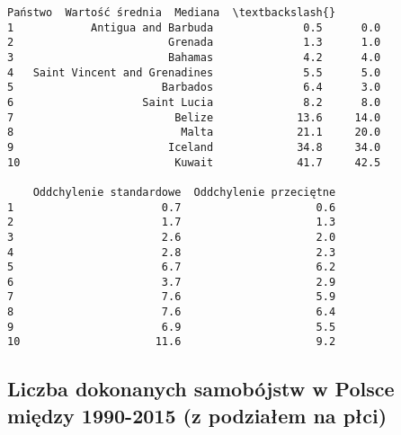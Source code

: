 \documentclass[11pt]{article}
\makeatletter
\newcommand{\boxspacing}{\kern\kvtcb@left@rule\kern\kvtcb@boxsep}
\newcommand{\prompt}[4]{
        {\ttfamily\llap{{\color{#2}[#3]:\hspace{3pt}#4}}\vspace{-\baselineskip}}
    }
\makeatother
\begin{document}
            \begin{tcolorbox}[breakable, size=fbox, boxrule=.5pt, pad at break*=1mm, opacityfill=0]
\prompt{Out}{outcolor}{10}{\boxspacing}
\begin{Verbatim}[commandchars=\\\{\}]
                         Państwo  Wartość średnia  Mediana  \textbackslash{}
1            Antigua and Barbuda              0.5      0.0
2                        Grenada              1.3      1.0
3                        Bahamas              4.2      4.0
4   Saint Vincent and Grenadines              5.5      5.0
5                       Barbados              6.4      3.0
6                    Saint Lucia              8.2      8.0
7                         Belize             13.6     14.0
8                          Malta             21.1     20.0
9                        Iceland             34.8     34.0
10                        Kuwait             41.7     42.5

    Oddchylenie standardowe  Oddchylenie przeciętne
1                       0.7                     0.6
2                       1.7                     1.3
3                       2.6                     2.0
4                       2.8                     2.3
5                       6.7                     6.2
6                       3.7                     2.9
7                       7.6                     5.9
8                       7.6                     6.4
9                       6.9                     5.5
10                     11.6                     9.2
\end{Verbatim}
\end{tcolorbox}
        
    \hypertarget{liczba-dokonanych-samobuxf3jstw-w-polsce-miux119dzy-1990-2015-z-podziaux142em-na-pux142ci}{%
\subsection{Liczba dokonanych samobójstw w Polsce między 1990-2015 (z
podziałem na
płci)}\label{liczba-dokonanych-samobuxf3jstw-w-polsce-miux119dzy-1990-2015-z-podziaux142em-na-pux142ci}}
\end{document}
